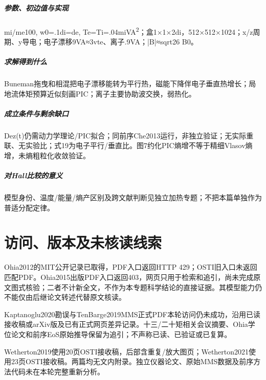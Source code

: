 \paragraph{参数、初边值与实现}mi/me100, w0=.1di=de, Te=Ti=.04miVA\textsuperscript{2}；盒1×1×2di，512×512×1024；x/z周期、y导电；电子漂移9VA≈3vte、离子.9VA；|B|≈sqrt26 B0。

\paragraph{求解得到什么}Buneman拖曳和相混把电子漂移能转为平行热，磁能下降伴电子垂直热增长；局地流体矩预算近似刻画PIC；离子主要协助波交换，弱热化。

\paragraph{成立条件与剩余缺口}Dez(t)仍需动力学理论/PIC拟合；同前序Che2013运行，非独立验证；无实际重联、无实验比；式19为电子平行/垂直比。图7约化PIC熵增不等于精细Vlasov熵增，未熵粗粒化收敛验证。

\paragraph{对Hall比较的意义}模型身份、温度/能量/熵产区别及跨文献判断见独立加热专题；不把本篇单独作为普适分配定律。

\chapter{访问、版本及未核读线索}

Ohia2012的MIT公开记录已取得，PDF入口返回HTTP 429；OSTI旧入口未返回匹配PDF。Ohia2015出版PDF入口返回403，网页只用于检索和追引，尚未完成原文图式核验；二者不计新全文，不作为本专题科学结论的直接证据。其模型能力仍不能仅由后继论文转述代替原文核读。

Kaptanoglu2020勘误与TenBarge2019MMS正式PDF本轮访问仍未成功，沿用已读接收稿或arXiv版及已有正式网页差异记录。十三/二十矩相关会议摘要、Ohia学位论文和前序EoS原始推导保留为追引；不声称已读、已验证或已复算。

Wetherton2019使用20页OSTI接收稿，后部含重复/放大图页；Wetherton2021使用23页OSTI接收稿。两篇均无文内附录。独立仪器论文、原始MMS数据及前序方法代码未在本轮完整重新分析。